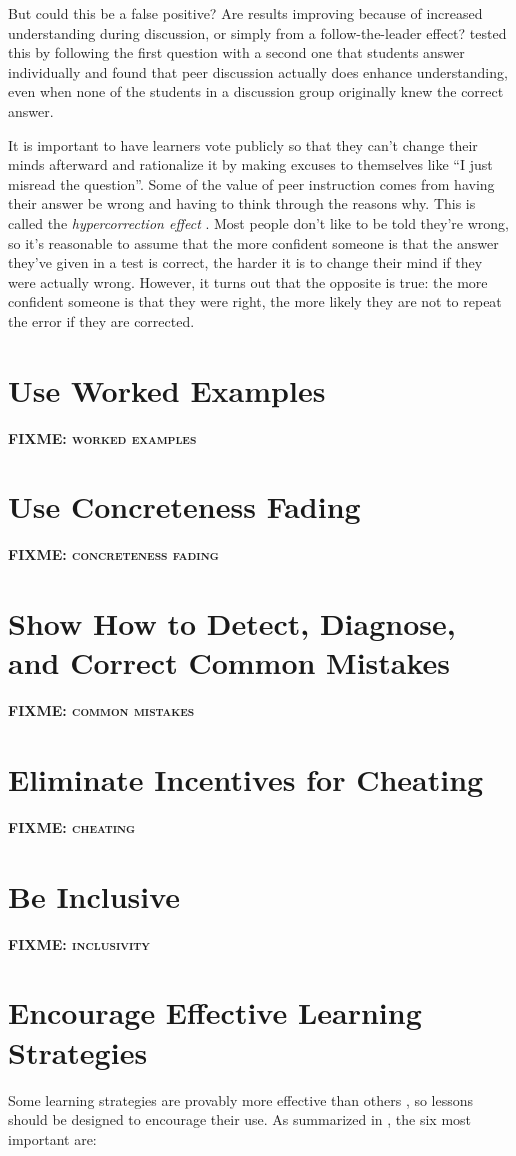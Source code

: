 \documentclass[10pt,letterpaper]{article}
\newcommand{\fixme}[1]{\textsc{\textbf{FIXME: {#1}}}}
\newcommand{\rulemajor}[1]{\section{#1}}
\begin{document}
But could this be a false positive? Are results improving because of increased
understanding during discussion, or simply from a follow-the-leader effect?
\cite{Smit2009} tested this by following the first question with a second one
that students answer individually and found that peer discussion actually does
enhance understanding, even when none of the students in a discussion group
originally knew the correct answer.

It is important to have learners vote publicly so that they can't change their
minds afterward and rationalize it by making excuses to themselves like ``I just
misread the question''.  Some of the value of peer instruction comes from having
their answer be wrong and having to think through the reasons why.  This is
called the \emph{hypercorrection effect} \cite{Metc2016}. Most people don't like
to be told they're wrong, so it's reasonable to assume that the more confident
someone is that the answer they've given in a test is correct, the harder it is
to change their mind if they were actually wrong.  However, it turns out that
the opposite is true: the more confident someone is that they were right, the
more likely they are not to repeat the error if they are corrected.

\rulemajor{Use Worked Examples}

\fixme{worked examples}

\rulemajor{Use Concreteness Fading}

\fixme{concreteness fading}

\rulemajor{Show How to Detect, Diagnose, and Correct Common Mistakes}

\fixme{common mistakes}

\rulemajor{Eliminate Incentives for Cheating}

\fixme{cheating}

\rulemajor{Be Inclusive}

\fixme{inclusivity}

\rulemajor{Encourage Effective Learning Strategies}

Some learning strategies are provably more effective than others \cite{Rohr2015,Kang2016,Miya2018},
so lessons should be designed to encourage their use.
As summarized in \cite{Wein2018a,Wein2018b},
the six most important are:
\end{document}
